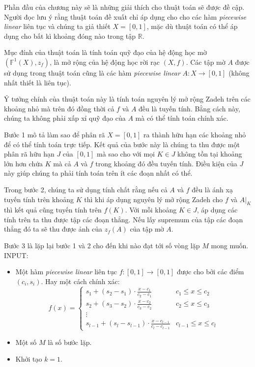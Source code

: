 \documentclass[../report.tex]{subfiles}
\begin{document}
Phần đầu của chương này sẽ là những giải thích cho thuật toán sẽ được 
đề cập. Người đọc lưu ý rằng thuật toán đề xuất chỉ áp dụng cho 
cho các hàm \textit{piecewise linear} liên tục và chúng ta giả thiết 
$X = [0, 1]$, mặc dù thuật toán có thể áp dụng cho bất kì khoảng đóng nào 
trong tập $\mathbb{R}$.

Mục đính của thuật toán là tính toán quỹ đạo của hệ động học mờ 
$(\mathbb{F}^1(X), z_f)$, là mở rộng của hệ động học rời rạc $(X, f)$.
Các tập mờ $A$ được sử dụng trong thuật toán cũng là các hàm 
\textit{piecewise linear} $A: X \rightarrow [0, 1]$ (không nhất 
thiết là liên tục). 

Ý tưởng chính của thuật toán này là tính toán nguyên lý mở rộng Zadeh 
trên các khoảng nhỏ mà trên đó đồng thời cả $f$ và $A$ đều là tuyến tính. 
Bằng cách này, chúng ta không phải xấp xỉ quỹ đạo của $A$ mà có thể tính
toán chính xác. 

Bước 1 mô tả làm sao để phân rã $X = [0, 1]$ ra thành hữu hạn các khoảng 
nhỏ để có thể tính toán trực tiếp. Kết quả của bước này là chúng ta 
thu được một phân rã hữu hạn $J$ của $[0, 1]$ mà sao cho với mọi 
$K \in J$ không tồn tại khoảng lớn hơn chứa $K$ mà cả $A$ và $f$ trong 
khoảng đó đều tuyến tính. Điều kiện của $J$ này giúp chúng ta phải 
tính toán trên ít các đoạn nhất có thể. 

Trong bước 2, chúng ta sử dụng tính chất rằng nếu cả $A$ và $f$ đều 
là ánh xạ tuyến tính trên khoảng $K$ thì khi áp dụng nguyên lý mở rộng 
Zadeh cho $f$ và $A|_{K}$ thì kết quả cũng tuyến tính trên $f(K)$.
Với mỗi khoảng $K \in J$, áp dụng các tính trên ta 
thu được tập các đoạn thẳng. Nếu lấy supremum của tập các đoạn thẳng 
đó ta sẽ thu được ảnh của $z_f(A)$ của tập mờ $A$. 

Bước 3 là lặp lại bước 1 và 2 cho đến khi nào đạt tới số 
vòng lặp $M$ mong muốn. \\[2mm]

INPUT:
\begin{itemize}
\item Một hàm \textit{piecewise linear} liên tục
$f: [0, 1] \rightarrow [0, 1]$
được cho bởi các điểm $(c_i, s_i)$. Hay một cách chính xác: 
$$
f(x) =
\begin{cases} 
s_1 + (s_2 - s_1) \cdot \frac{x - c_1}{c_2 - c_1} & c_1 \le x \le c_2 \\
s_2 + (s_3 - s_2) \cdot \frac{x - c_2}{c_3 - c_2} & c_2 \le x \le c_3 \\
\vdots&\\
s_{l - 1} + (s_l - s_{l - 1}) \cdot \frac{x - c_{l - 1}}{c_l - c_{l - 1}} & 
c_{l - 1} \le x \le c_l
\end{cases}
$$

\item Một số $M$ là số bước lặp. 
\item Khởi tạo $k = 1$.
\end{itemize}
\end{document}
